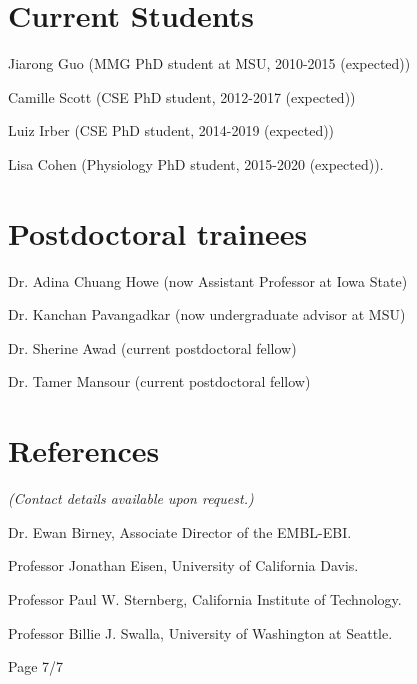 \documentclass[margin,line]{resume}
\begin{document}
\begin{resume}
\section{\mysidestyle Current Students}

\begin{list1}
\item[] Jiarong Guo (MMG PhD student at MSU, 2010-2015 (expected))
\item[] Camille Scott (CSE PhD student, 2012-2017 (expected))
\item[] Luiz Irber (CSE PhD student, 2014-2019 (expected))
\item[] Lisa Cohen (Physiology PhD student, 2015-2020 (expected)).
\end{list1}


\section{\mysidestyle Postdoctoral trainees}

\begin{list1}
\item[] Dr. Adina Chuang Howe (now Assistant Professor at Iowa State)
\item[] Dr. Kanchan Pavangadkar (now undergraduate advisor at MSU)
\item[] Dr. Sherine Awad (current postdoctoral fellow)
\item[] Dr. Tamer Mansour (current postdoctoral fellow)
\end{list1}

\section{\mysidestyle References}

{\em (Contact details available upon request.)}

Dr. Ewan Birney, Associate Director of the EMBL-EBI.

Professor Jonathan Eisen, University of California Davis.

Professor Paul W. Sternberg, California Institute of Technology.

Professor Billie J. Swalla, University of Washington at Seattle.

\vspace{2cm}
{\centerline {Page 7/7}}

\end{resume}
\end{document}
